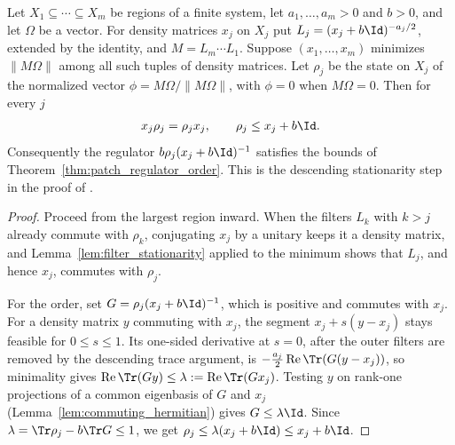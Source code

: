 \begin{theorem}
\label{thm:patch_stationarity}
\leanok
{}
Let $X_1\subseteq\cdots\subseteq X_m$ be regions of a finite system, let
$a_1,\dots,a_m>0$ and $b>0$, and let $\Omega$ be a vector. For density
matrices $x_j$ on $X_j$ put $L_j=(x_j+b\Id)^{-a_j/2}$, extended by the
identity, and $M=L_m\cdots L_1$. Suppose $(x_1,\dots,x_m)$ minimizes
$\lVert M\Omega\rVert$ among all such tuples of density matrices. Let
$\rho_j$ be the state on $X_j$ of the normalized vector $\phi=M\Omega/\lVert
M\Omega\rVert$, with $\phi=0$ when $M\Omega=0$. Then for every $j$
\begin{align}
 x_j\rho_j=\rho_jx_j,\qquad \rho_j\le x_j+b\Id .
\end{align}
Consequently the regulator $b\rho_j(x_j+b\Id)^{-1}$ satisfies the bounds of
Theorem~\ref{thm:patch_regulator_order}. This is the descending stationarity
step in the proof of \cite[Proposition~4.1]{OpenAI2026PolynomialPEPS}.
\end{theorem}
\begin{proof}
\leanok
Proceed from the largest region inward. When the filters $L_k$ with $k>j$
already commute with $\rho_k$, conjugating $x_j$ by a unitary keeps it a
density matrix, and Lemma~\ref{lem:filter_stationarity} applied to the minimum
shows that $L_j$, and hence $x_j$, commutes with $\rho_j$.

For the order, set $G=\rho_j(x_j+b\Id)^{-1}$, which is positive and commutes
with $x_j$. For a density matrix $y$ commuting with $x_j$, the segment
$x_j+s(y-x_j)$ stays feasible for $0\le s\le1$. Its one-sided derivative at
$s=0$, after the outer filters are removed by the descending trace argument, is
$-\tfrac{a_j}{2}\operatorname{Re}\Tr(G(y-x_j))$, so minimality gives
$\operatorname{Re}\Tr(Gy)\le\lambda:=\operatorname{Re}\Tr(Gx_j)$. Testing
$y$ on rank-one projections of a common eigenbasis of $G$ and $x_j$
(Lemma~\ref{lem:commuting_hermitian}) gives $G\le\lambda\Id$. Since
$\lambda=\Tr\rho_j-b\Tr G\le1$, we get $\rho_j\le\lambda(x_j+b\Id)\le x_j+b\Id$.
\end{proof}

